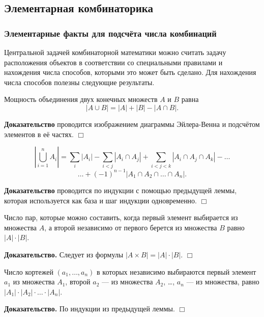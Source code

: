 	\subsection{Элементарная комбинаторика}
	
	\subsubsection{Элементарные факты для подсчёта числа комбинаций}
	
	Центральной задачей комбинаторной математики можно считать задачу расположения объектов в соответствии со специальными правилами и нахождения числа способов, которыми это может быть сделано.
	Для нахождения числа способов полезны следующие результаты.
	
	\begin{lemma}%
		Мощность объединения двух конечных множеств $A$ и $B$ равна
		$$|A\cup B| = |A| + |B| - |A\cap B|.$$
	\end{lemma}
	\textbf{Доказательство} проводится изображением диаграммы Эйлера-Венна и подсчётом элементов в её частях. $\Box$
	
	
	\begin{lemma}
		$$\left|\bigcup_{i=1}^{n}A_i \right| = \sum_{i} | A_i | - \sum_{i<j} | A_i \cap A_j | + \sum_{i<j<k} | A_i \cap A_j \cap A_k | - \ldots$$
		$$\ldots + (-1)^{n-1} | A_1 \cap A_2 \cap \ldots \cap A_n |.$$
	\end{lemma}
	\noindent\textbf{Доказательство} проводится по индукции с помощью предыдущей леммы, которая используется как база и шаг индукции одновременно. $\Box$
	
	\begin{lemma}
		Число пар, которые можно составить, когда первый элемент выбирается из множества $A$, а второй независимо от первого берется из множества $B$ равно $|A|\cdot|B|$.
	\end{lemma}
	\noindent\textbf{Доказательство.} Следует из формулы $|A\times B| = |A|\cdot|B|$. $\Box$
	
	
	\begin{lemma}%
		Число кортежей $(a_1, \ldots, a_n)$ в которых независимо выбираются первый элемент $a_1$ из множества $A_1$, второй $a_2$ --- из множества $A_2$, \ldots, $a_n$ --- из множества, равно  $|A_1|\cdot|A_2|\cdot\ldots\cdot|A_n|$.
	\end{lemma}
	\noindent\textbf{Доказательство.} По индукции из предыдущей леммы. $\Box$
	
